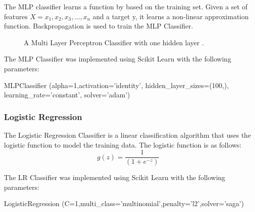 The MLP classifier learns a function by based on the training set. Given a set of features $X = x_1,x_2,x_3,...,x_n$ and a target y, it learns a non-linear approximation function. Backpropagation is used to train the MLP Classifier.

\begin{figure}[h!]
\centering
{}
\caption{\label{fig:mlp} A Multi Layer Perceptron Classifier with one hidden layer \cite{scikit-learn}.}
\end{figure}

The MLP Classifier was implemented using Scikit Learn with the following parameters:

\begin{tcolorbox}
\begin{center}
	MLPClassifier (alpha=1,activation='identity', hidden\_layer\_sizes=(100,), learning\_rate='constant', solver='adam')
\end{center}
\end{tcolorbox}

\subsubsection*{Logistic Regression}

The Logistic Regression Classifier is a linear classification algorithm that uses the logistic function to model the training data. The logistic function is as follows:
\begin{equation}
  g(z)= \frac{1}{(1+e^{-z})}  
\end{equation}

The LR Classifier was implemented using Scikit Learn with the following parameters:

\begin{tcolorbox}
\begin{center}
	LogisticRegression (C=1,multi\_class='multinomial',penalty='l2',solver='saga')
\end{center}
\end{tcolorbox}

